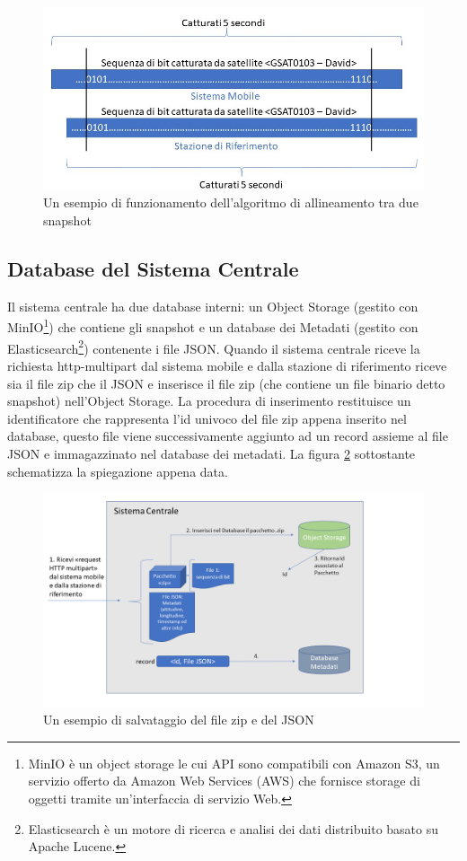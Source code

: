  \begin{figure}[h]
\centering
\includegraphics[scale=0.5]{images/grafico allineamento snapshot.jpg}
\caption{Un esempio di funzionamento dell'algoritmo di allineamento tra due snapshot}
\label{fig: algoritmoallineamento }
\end{figure}

\subsection{Database del Sistema Centrale}
Il sistema centrale ha due database interni: un Object Storage (gestito con MinIO\footnote{MinIO è un object storage le cui API sono compatibili con Amazon S3, un servizio offerto da Amazon Web Services (AWS) che fornisce storage di oggetti tramite un'interfaccia di servizio Web.}) che contiene gli snapshot e un database dei Metadati (gestito con Elasticsearch\footnote{Elasticsearch è un motore di ricerca e analisi dei dati distribuito basato su Apache Lucene.}) contenente i file JSON. Quando il sistema centrale riceve la richiesta http-multipart dal sistema mobile e dalla stazione di riferimento riceve sia il file zip che il JSON e inserisce il file zip (che contiene un file binario detto snapshot) nell'Object Storage. La procedura di inserimento restituisce un identificatore che rappresenta l'id univoco del file zip appena inserito nel database, questo file viene successivamente aggiunto ad un record assieme al file JSON e immagazzinato nel database dei metadati. La figura \ref{fig: salvataggioinfo } sottostante schematizza la spiegazione appena data.
\begin{figure}[!h]
\centering
\includegraphics[scale=0.4]{images/Foto4.png}
\caption{Un esempio di salvataggio del file zip e del JSON}
\label{fig: salvataggioinfo }
\end{figure}


